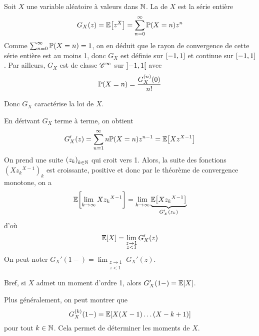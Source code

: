 \begin{definition}
    Soit \(X\) une variable aléatoire à valeurs dans \(\mathbb{N}\). La  de \(X\)
    est la série entière
    \begin{equation*}
        G_X(z) = \mathbb{E}\mathopen{}\left[z^X\right]\mathclose{} = \sum_{n=0}^{\infty} \mathbb{P}(X=n)z^n
    \end{equation*}
    Comme \(\sum_{n=0}^{\infty} \mathbb{P}(X=n) = 1\), on en déduit que le rayon de convergence de cette série
    entière est au moins 1, donc \(G_X\) est définie sur \(\mathopen{}\left[-1,1\right]\mathclose{}\) et continue sur \(\mathopen{}\left[-1,1\right]\mathclose{}\).
    Par ailleurs, \(G_X\) est de classe \(\mathscr{C}^\infty\) sur \(\mathopen{}\left]-1,1\right[\mathclose{}\) avec
    \begin{equation*}
        \mathbb{P}(X=n) = \frac{G_X^{(n)}(0)}{n!}
    \end{equation*}

    Donc \(G_X\) caractérise la loi de \(X\).

    En dérivant \(G_X\) terme à terme, on obtient
    \begin{equation*}
        G_X'(z) = \sum_{n=1}^{\infty} n\mathbb{P}(X=n)z^{n-1} = \mathbb{E}\mathopen{}\left[Xz^{X-1}\right]\mathclose{}
    \end{equation*}
    On prend une suite \({(z_k)}_{k\in\mathbb{N}}\) qui croit vers 1. Alors, la suite
    des fonctions \({\left(X {z_k}^{X-1}\right)}_k\) est croissante, positive et
    donc par le théorème de convergence monotone, on a
    \begin{equation*}
        \mathbb{E}\mathopen{}\left[\lim_{k\to\infty} X{z_k}^{X-1}\right]\mathclose{} = \lim_{k\to\infty} \underbrace{\mathbb{E}\mathopen{}\left[X{z_k}^{X-1}\right]\mathclose{}}_{G_X'(z_k)}
    \end{equation*}
    d'où
    \begin{equation*}
        \mathbb{E}\mathopen{}\left[X\right]\mathclose{} = \lim_{\substack{z\to 1\\ z<1}} G_X'(z)
    \end{equation*}
    On peut noter \(G_X'(1-) = \lim_{\substack{z\to 1\\ z<1}} G_X'(z)\).

    Bref, si \(X\) admet un moment d'ordre 1, alors \(G_X'(1-) = \mathbb{E}\mathopen{}\left[X\right]\mathclose{}\).

    Plus généralement, on peut montrer que 
    \begin{equation*}
        G_X^{(k)}(1-) = \mathbb{E}\mathopen{}\left[X(X-1)\ldots(X-k+1)\right]\mathclose{}
    \end{equation*}
    pour tout \(k\in\mathbb{N}\). Cela permet de déterminer les moments de \(X\).
\end{definition}

